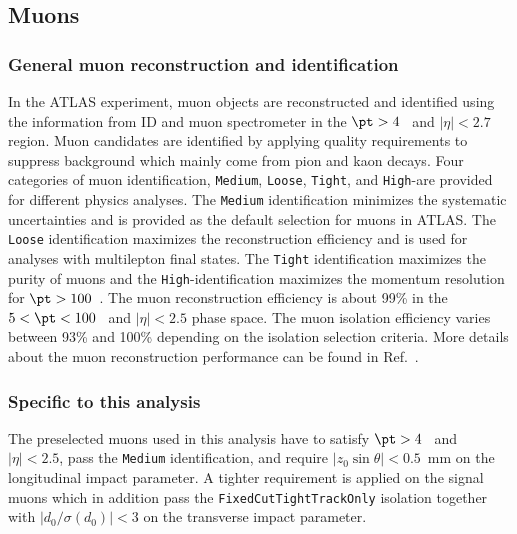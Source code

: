 
\subsection{Muons}
\label{subsec:event_muons}


\subsubsection{General muon reconstruction and identification}
\label{subsubsec:event_muons_general}
In the ATLAS experiment, muon objects are reconstructed and identified using the information from ID and muon spectrometer in the $\pt > 4$~{\GeV} and $|\eta| < 2.7$ region.
Muon candidates are identified by applying quality requirements to suppress background which mainly come from pion and kaon decays.
Four categories of muon identification, \texttt{Medium}, \texttt{Loose}, \texttt{Tight}, and \texttt{High}-\pt are provided for different physics analyses.
The \texttt{Medium} identification minimizes the systematic uncertainties and is provided as the default selection for muons in ATLAS.
The \texttt{Loose} identification maximizes the reconstruction efficiency and is used for analyses with multilepton final states.
The \texttt{Tight} identification maximizes the purity of muons and the \texttt{High}-\pt identification maximizes the momentum resolution for $\pt > 100$~{\GeV}.
The muon reconstruction efficiency is about 99\% in the $5 < \pt < 100$~{\GeV} and $|\eta| < 2.5$ phase space.
The muon isolation efficiency varies between 93\% and 100\% depending on the isolation selection criteria.
More details about the muon reconstruction performance can be found in Ref.~\cite{Aad:2016jkr}.


\subsubsection{Specific to this analysis}
\label{subsubsec:event_muons_specific}
The preselected muons used in this analysis have to satisfy $\pt > 4$~{\GeV} and $|\eta| < 2.5$, pass the \texttt{Medium} identification, and require $|z_{0}\sin\theta| < 0.5$~mm on the longitudinal impact parameter.
A tighter requirement is applied on the signal muons which in addition pass the \texttt{FixedCutTightTrackOnly} isolation together with $|d_{0}/\sigma(d_{0})| < 3$ on the transverse impact parameter.

